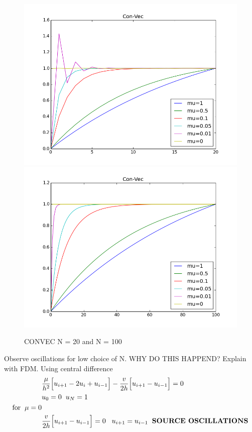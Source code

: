 \documentclass[a4paper,norsk]{article}
\begin{document}
\begin{figure}[h!]
	\centering
	\caption*{CONVEC N = 20 and N = 100}
	\includegraphics[scale=0.36]{convec.png}
	\includegraphics[scale=0.36]{convechighn.png}
\end{figure}
Observe oscillations for low choice of N. WHY DO THIS HAPPEND? Explain with FDM.
\newpage
Using central difference
\begin{align*}
&\frac{\mu}{h^2}\Big[u_{i+1} - 2u_{i} + u_{i-1} \Big] - \frac{v}{2 h} \Big[u_{i+1} - u_{i-1} \Big] = 0 \\
&u_0 = 0 \hspace{2mm} u_N = 1 \hspace{3mm} \\ 
\text{for} \hspace{2mm} \mu = 0 \\
&\frac{v}{2 h} \Big[u_{i+1} - u_{i-1} \Big] = 0 \hspace{3mm} u_{i+1} = u_{i-1} \hspace{2mm} \textbf{SOURCE OSCILLATIONS}
\end{align*}
\end{document}
